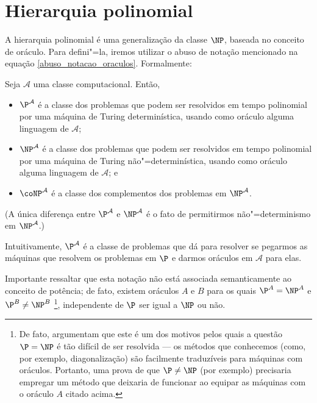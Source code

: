 \section{Hierarquia polinomial}
\label{hierarquia_polinomial}

A hierarquia polinomial é uma generalização da classe $\NP$,
baseada no conceito de oráculo.
Para defini"=la,
iremos utilizar o abuso de notação mencionado na equação
\ref{abuso_notacao_oraculos}.
Formalmente:

\begin{definition}
    Seja $\mathcal A$ uma classe computacional.
    Então,
    \begin{itemize}
        \item $\P^\mathcal A$
            é a classe dos problemas que podem ser resolvidos em tempo polinomial
            por uma máquina de Turing determinística,
            usando como oráculo alguma linguagem de $\mathcal A$;
        \item $\NP^\mathcal A$
            é a classe dos problemas que podem ser resolvidos em tempo polinomial
            por uma máquina de Turing não"=determinística,
            usando como oráculo alguma linguagem de $\mathcal A$;
            e
        \item $\coNP^\mathcal A$
            é a classe dos complementos dos problemas em $\NP^\mathcal A$.
    \end{itemize}
\end{definition}

(A única diferença entre $\P^\mathcal A$ e $\NP^\mathcal A$
é o fato de permitirmos não"=determinismo em $\NP^\mathcal A$.)

Intuitivamente,
$\P^\mathcal A$ é a classe de problemas que dá para resolver
se pegarmos as máquinas que resolvem os problemas em $\P$
e darmos oráculos em $\mathcal A$ para elas.

Importante ressaltar que esta notação
não está associada semanticamente ao conceito de potência;
de fato,
existem oráculos $A$ e $B$ para os quais
$\P ^ A = \NP ^ A$ e $\P ^ B \neq \NP ^ B$
\cite[p. 362]{HopcroftUllman1979}%
\footnote{
    De fato, 
    argumentam que este é um dos motivos pelos quais
    a questão $\P = \NP$ é tão difícil de ser resolvida
    --- os métodos que conhecemos
    (como, por exemplo, diagonalização)
    são facilmente traduzíveis para máquinas com oráculos.
    Portanto,
    uma prova de que $\P \neq \NP$ (por exemplo)
    precisaria empregar um método que deixaria de funcionar
    ao equipar as máquinas com o oráculo $A$ citado acima.
},
independente de $\P$ ser igual a $\NP$ ou não.


